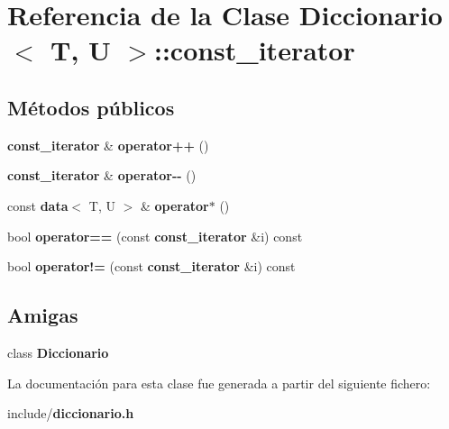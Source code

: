 \section{Referencia de la Clase Diccionario$<$ T, U $>$\+:\+:const\+\_\+iterator}
\label{classDiccionario_1_1const__iterator}
\subsection*{Métodos públicos}
\begin{DoxyCompactItemize}
\item 
{\bf const\+\_\+iterator} \& {\bfseries operator++} ()\label{classDiccionario_1_1const__iterator_af923feb3b386f14de993ff221b8b19d1}

\item 
{\bf const\+\_\+iterator} \& {\bfseries operator-\/-\/} ()\label{classDiccionario_1_1const__iterator_accef51f7cda1149d52a187986ad328cb}

\item 
const {\bf data}$<$ T, U $>$ \& {\bfseries operator$\ast$} ()\label{classDiccionario_1_1const__iterator_a8d616c186d5d40873e0354ed2739dbd8}

\item 
bool {\bfseries operator==} (const {\bf const\+\_\+iterator} \&i) const \label{classDiccionario_1_1const__iterator_a506f760dafc0b7d5215b924e98fe8522}

\item 
bool {\bfseries operator!=} (const {\bf const\+\_\+iterator} \&i) const \label{classDiccionario_1_1const__iterator_a6915b38389c484f4caecc455d8b1a311}

\end{DoxyCompactItemize}
\subsection*{Amigas}
\begin{DoxyCompactItemize}
\item 
class {\bfseries Diccionario}\label{classDiccionario_1_1const__iterator_ad36be158dde0129b4e0d03d0e454a26b}

\end{DoxyCompactItemize}


La documentación para esta clase fue generada a partir del siguiente fichero\+:\begin{DoxyCompactItemize}
\item 
include/{\bf diccionario.\+h}\end{DoxyCompactItemize}
